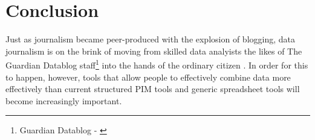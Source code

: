 \documentclass{sigchi}
\begin{document}




%
%
%

\section{Conclusion} %



Just as journalism became peer-produced with the explosion of blogging, data journalism is on the brink of moving from skilled data analyists the likes of The Guardian Datablog staff\footnote{Guardian Datablog - \url{}} into the hands of the ordinary citizen \cite{datajournalismhandbook}.  In order for this to happen, however, tools that allow people to effectively combine data more effectively than current structured PIM tools and generic spreadsheet tools will become increasingly important. 
\end{document}
